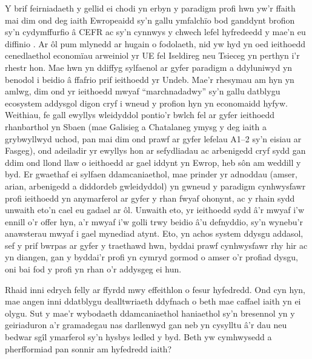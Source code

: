 Y brif feirniadaeth y gellid ei chodi yn erbyn y paradigm profi hwn yw'r ffaith mai dim ond deg iaith Ewropeaidd sy'n gallu ymfalchïo bod ganddynt brofion sy'n cydymffurfio â CEFR ac sy'n cynnwys y chwech lefel hyfredeedd y mae'n eu diffinio \parencite{noauthor_common_2025, noauthor_cadre_2025}. Ar ôl pum mlynedd ar hugain o fodolaeth, nid yw hyd yn oed ieithoedd cenedlaethol economïau arweiniol yr UE fel Iseldireg neu Tsieceg yn perthyn i'r rhestr hon. Mae hwn yn ddiffyg sylfaenol ar gyfer paradigm a ddyluniwyd yn benodol i beidio â ffafrio prif ieithoedd yr Undeb. Mae'r rhesymau am hyn yn amlwg, dim ond yr ieithoedd mwyaf ``marchnadadwy'' sy'n gallu datblygu ecosystem addysgol digon cryf i wneud y profion hyn yn economaidd hyfyw. Weithiau, fe gall ewyllys wleidyddol pontio'r bwlch fel ar gyfer ieithoedd rhanbarthol yn Sbaen (mae Galisieg a Chatalaneg ymysg y deg iaith a grybwyllwyd uchod, pan mai dim ond prawf ar gyfer lefelau A1–2 sy'n eisiau ar Fasgeg), ond adeiladir yr ewyllys hon ar sefydliadau ac arbenigedd cryf sydd gan ddim ond llond llaw o ieithoedd ar gael iddynt yn Ewrop, heb sôn am weddill y byd. Er gwaethaf ei sylfaen ddamcaniaethol, mae prinder yr adnoddau (amser, arian, arbenigedd a diddordeb gwleidyddol) yn gwneud y paradigm cynhwysfawr profi ieithoedd yn anymarferol ar gyfer y rhan fwyaf ohonynt, ac y rhain sydd unwaith eto’n cael eu gadael ar ôl. Unwaith eto, yr ieithoedd sydd â'r mwyaf i'w ennill o'r offer hyn, a'r mwyaf i'w golli trwy beidio â'u defnyddio, sy'n wynebu'r anawsterau mwyaf i gael mynediad atynt. Eto, yn achos system ddysgu addasol, sef y prif bwrpas ar gyfer y traethawd hwn, byddai prawf cynhwysfawr rhy hir ac yn diangen, gan y byddai'r profi yn cymryd gormod o amser o'r profiad dysgu, oni bai fod y profi yn rhan o'r addysgeg ei hun.

Rhaid inni edrych felly ar ffyrdd mwy effeithlon o fesur hyfedredd. Ond cyn hyn, mae angen inni ddatblygu dealltwriaeth ddyfnach o beth mae caffael iaith yn ei olygu. Sut y mae'r wybodaeth ddamcaniaethol haniaethol sy'n bresennol yn y geiriaduron a'r gramadegau nas darllenwyd gan neb yn cysylltu â'r dau neu bedwar sgîl ymarferol sy'n hysbys ledled y byd.  Beth yw cymhwysedd a pherfformiad pan sonnir am hyfedredd iaith?

